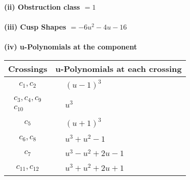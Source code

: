 \documentclass[1p]{elsarticle_modified}
\theoremstyle{definition}
\begin{document}
\flushleft \textbf{(ii) Obstruction class $= 1$}\\~\\
\flushleft \textbf{(iii) Cusp Shapes $= -6 u^2-4 u-16$}\\~\\
\newpage\renewcommand{\arraystretch}{1}
\flushleft \textbf{(iv) u-Polynomials at the component}\newline \\
\begin{tabular}{m{50pt}|m{274pt}}
Crossings & \hspace{64pt}u-Polynomials at each crossing \\
\hline $$\begin{aligned}c_{1},c_{2}\end{aligned}$$&$\begin{aligned}
&(u-1)^3
\end{aligned}$\\
\hline $$\begin{aligned}c_{3},c_{4},c_{9}\\c_{10}\end{aligned}$$&$\begin{aligned}
&u^3
\end{aligned}$\\
\hline $$\begin{aligned}c_{5}\end{aligned}$$&$\begin{aligned}
&(u+1)^3
\end{aligned}$\\
\hline $$\begin{aligned}c_{6},c_{8}\end{aligned}$$&$\begin{aligned}
&u^3+u^2-1
\end{aligned}$\\
\hline $$\begin{aligned}c_{7}\end{aligned}$$&$\begin{aligned}
&u^3- u^2+2 u-1
\end{aligned}$\\
\hline $$\begin{aligned}c_{11},c_{12}\end{aligned}$$&$\begin{aligned}
&u^3+u^2+2 u+1
\end{aligned}$\\
\hline
\end{tabular}\\~\\
\end{document}
